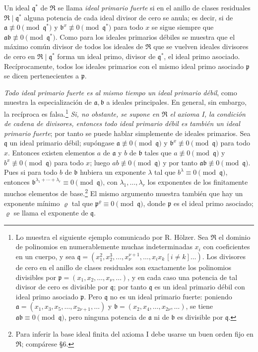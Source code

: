 \documentclass[11pt]{article}
\providecommand{\mR}{\mathfrak{R}}
\providecommand{\ma}{\mathfrak{a}}
\providecommand{\mb}{\mathfrak{b}}
\providecommand{\mpideal}{\mathfrak{p}}
\providecommand{\mq}{\mathfrak{q}}
\begin{document}
Un ideal $\mq^*$ de $\mR$ se llama \emph{ideal primario fuerte} si en el anillo de clases residuales $\mR\mid\mq^*$ alguna potencia de cada ideal divisor de cero se anula; es decir, si de $\ma\not\equiv0\pmod{\mq^*}$ y $\mb^x\not\equiv0\pmod{\mq^*}$ para todo $x$ se sigue siempre que $\ma\mb\not\equiv0\pmod{\mq^*}$. Como para los ideales primarios débiles se muestra que el máximo común divisor de todos los ideales de $\mR$ que se vuelven ideales divisores de cero en $\mR\mid\mq^*$ forma un ideal primo, divisor de $\mq^*$, el ideal primo asociado. Recíprocamente, todos los ideales primarios con el mismo ideal primo asociado $\mpideal$ se dicen pertenecientes a $\mpideal$.

\emph{Todo ideal primario fuerte es al mismo tiempo un ideal primario débil}, como muestra la especialización de $\ma,\mb$ a ideales principales. En general, sin embargo, la recíproca es falsa.\footnote{Lo muestra el siguiente ejemplo comunicado por R. Hölzer. Sea $\mR$ el dominio de polinomios en numerablemente muchas indeterminadas $x_i$ con coeficientes en un cuerpo, y sea $\mq=(x_1^2,x_2^3,\ldots,x_\nu^{\nu+1},\ldots,x_i x_k\,[i\ne k]\ldots)$. Los divisores de cero en el anillo de clases residuales son exactamente los polinomios divisibles por $\mpideal=(x_1,x_2,\ldots,x_\nu,\ldots)$, y en cada caso una potencia de tal divisor de cero es divisible por $\mq$; por tanto $\mq$ es un ideal primario débil con ideal primo asociado $\mpideal$. Pero $\mq$ no es un ideal primario fuerte: poniendo $\ma=(x_1,x_3,x_5,\ldots,x_{2\nu+1},\ldots)$ y $\mb=(x_2,x_4,\ldots,x_{2\nu},\ldots)$, se tiene $\ma\mb\equiv0\pmod{\mq}$, pero ninguna potencia de $\ma$ ni de $\mb$ es divisible por $\mq$.} \emph{Si, no obstante, se supone en $\mR$ el axioma I, la condición de cadena de divisores, entonces todo ideal primario débil es también un ideal primario fuerte}; por tanto se puede hablar simplemente de ideales primarios. Sea $\mq$ un ideal primario débil; supóngase $\ma\not\equiv0\pmod{\mq}$ y $\mb^x\not\equiv0\pmod{\mq}$ para todo $x$. Entonces existen elementos $a$ de $\ma$ y $b$ de $\mb$ tales que $a\not\equiv0\pmod{\mq}$ y $b^x\not\equiv0\pmod{\mq}$ para todo $x$; luego $ab\not\equiv0\pmod{\mq}$ y por tanto $\ma\mb\not\equiv0\pmod{\mq}$. Pues si para todo $b$ de $\mb$ hubiera un exponente $\lambda$ tal que $b^\lambda\equiv0\pmod{\mq}$, entonces $\mb^{\lambda_1+\cdots+\lambda_r}\equiv0\pmod{\mq}$, con $\lambda_1,\ldots,\lambda_r$ los exponentes de los finitamente muchos elementos de base.\footnote{Para inferir la base ideal finita del axioma I debe usarse un buen orden fijo en $\mR$; compárese §6.} El mismo argumento muestra también que hay un exponente mínimo $\varrho$ tal que $\mpideal^\varrho\equiv0\pmod{\mq}$, donde $\mpideal$ es el ideal primo asociado; $\varrho$ se llama el exponente de $\mq$.
\end{document}
